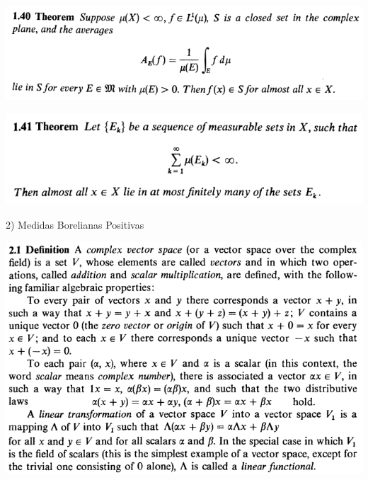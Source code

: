 \documentclass[12pt]{article}
\begin{document}
		\begin{center}
		\includegraphics{1ponto40}
		\end{center}

		\begin{center}
		\includegraphics{1ponto41}
		\end{center}

\vspace{3mm}

2) Medidas Borelianas Positivas

\vspace{3mm}

		\begin{center}
		\includegraphics{d2ponto1}
		\end{center}
\end{document}
